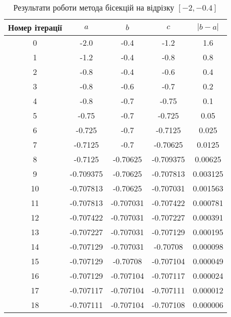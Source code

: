 \begin{table}[h!]
    \centering
    \begin{tabular}{|c|c|c|c|c|}
        \hline
        \textbf{Номер ітерації} & $a$ & $b$ & $c$ & $|b-a|$ \\
        \hline
        0 & -2.0 & -0.4 & -1.2 & 1.6 \\
        \hline
        1 & -1.2 & -0.4 & -0.8 & 0.8 \\
        \hline
        2 & -0.8 & -0.4 & -0.6 & 0.4 \\
        \hline
        3 & -0.8 & -0.6 & -0.7 & 0.2 \\
        \hline
        4 & -0.8 & -0.7 & -0.75 & 0.1 \\
        \hline
        5 & -0.75 & -0.7 & -0.725 & 0.05 \\
        \hline
        6 & -0.725 & -0.7 & -0.7125 & 0.025 \\
        \hline
        7 & -0.7125 & -0.7 & -0.70625 & 0.0125 \\
        \hline
        8 & -0.7125 & -0.70625 & -0.709375 & 0.00625 \\
        \hline
        9 & -0.709375 & -0.70625 & -0.707813 & 0.003125 \\
        \hline
        10 & -0.707813 & -0.70625 & -0.707031 & 0.001563 \\
        \hline
        11 & -0.707813 & -0.707031 & -0.707422 & 0.000781 \\
        \hline
        12 & -0.707422 & -0.707031 & -0.707227 & 0.000391 \\
        \hline
        13 & -0.707227 & -0.707031 & -0.707129 & 0.000195 \\
        \hline
        14 & -0.707129 & -0.707031 & -0.70708 & 0.000098 \\
        \hline
        15 & -0.707129 & -0.70708 & -0.707104 & 0.000049 \\
        \hline
        16 & -0.707129 & -0.707104 & -0.707117 & 0.000024 \\
        \hline
        17 & -0.707117 & -0.707104 & -0.707111 & 0.000012 \\
        \hline
        18 & -0.707111 & -0.707104 & -0.707108 & 0.000006 \\
        \hline
    \end{tabular}
    \caption{Результати роботи метода бісекцій на відрізку $[-2, -0.4]$}
\end{table}

